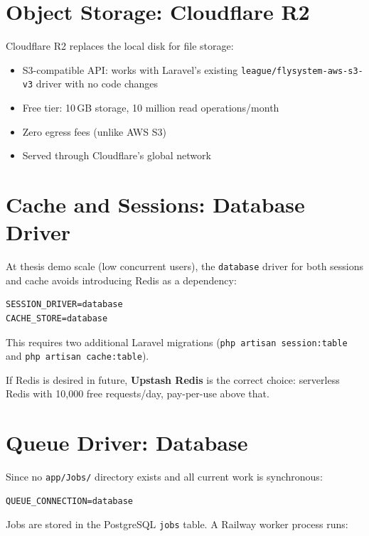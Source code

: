 \documentclass[12pt,a4paper]{report}
\begin{document}
\section{Object Storage: Cloudflare R2}

Cloudflare R2 replaces the local disk for file storage:

\begin{itemize}[leftmargin=1.5em]
    \item S3-compatible API: works with Laravel's existing
          \texttt{league/flysystem-aws-s3-v3} driver with no code changes
    \item Free tier: 10\,GB storage, 10 million read operations/month
    \item Zero egress fees (unlike AWS S3)
    \item Served through Cloudflare's global network
\end{itemize}

\section{Cache and Sessions: Database Driver}

At thesis demo scale (low concurrent users), the \texttt{database}
driver for both sessions and cache avoids introducing Redis as a
dependency:

\begin{lstlisting}[caption={Production .env session/cache settings}]
SESSION_DRIVER=database
CACHE_STORE=database
\end{lstlisting}

This requires two additional Laravel migrations
(\texttt{php artisan session:table} and
\texttt{php artisan cache:table}).

If Redis is desired in future, \textbf{Upstash Redis} is the correct
choice: serverless Redis with 10,000 free requests/day, pay-per-use
above that.

\section{Queue Driver: Database}

Since no \texttt{app/Jobs/} directory exists and all current work is
synchronous:

\begin{lstlisting}[caption={Production .env queue settings}]
QUEUE_CONNECTION=database
\end{lstlisting}

Jobs are stored in the PostgreSQL \texttt{jobs} table. A Railway
worker process runs:
\end{document}
